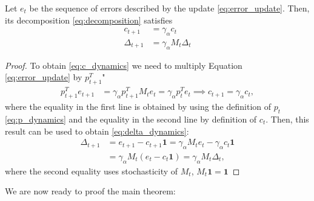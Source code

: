 \documentclass{article}
\begin{document}
\begin{lemma} \label{lem:c_delta_dynamics}
Let $e_t$ be the sequence of errors described by the update \ref{eq:error_update}. Then, its decomposition \ref{eq:decomposition} satisfies
\begin{align}
c_{t+1} &= \gamma_\alpha c_t \label{eq:c_dynamics} \\
\Delta_{t+1} &= \gamma_\alpha M_t \Delta_t \label{eq:delta_dynamics}
\end{align}
\end{lemma}
\begin{proof}
To obtain \ref{eq:c_dynamics} we need to multiply Equation \ref{eq:error_update} by $p_{t+1}^T$"
\begin{align*}
p_{t+1}^T e_{t+1} &= \gamma_\alpha p_{t+1}^T M_t e_{t} = \gamma_\alpha p_t^T e_t \implies
c_{t+1} = \gamma_\alpha c_t,
\end{align*}
where the equality in the first line is obtained by using the definition of $p_t$ \ref{eq:p_dynamics} and the equality in the second line by definition of $c_t$. 
Then, this result can be used to obtain \ref{eq:delta_dynamics}:
\begin{align*}
\Delta_{t+1} &= e_{t+1} - c_{t+1} \mathbf{1} = \gamma_\alpha M_t e_t - \gamma_\alpha c_t \mathbf{1}\\
    &= \gamma_\alpha M_t (e_t - c_t \mathbf{1}) = \gamma_\alpha M_t \Delta_t,
\end{align*}
where the second equality uses stochasticity of $M_t$, $M_t \mathbf{1}= \mathbf{1} $
\end{proof}
We are now ready to proof the main theorem:
\end{document}
